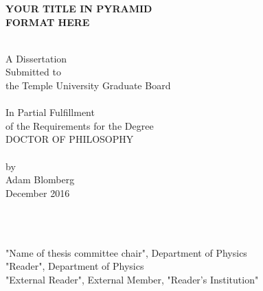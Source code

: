 \begin{titlepage}

\begin{centering} 
{\bf {\Large YOUR TITLE IN PYRAMID \\ FORMAT HERE}}

\vspace{1cm}
\noindent\makebox[\linewidth]{\rule{16cm}{0.4pt}} \\ 
\vspace{1cm}
A Dissertation                       \\
Submitted to                         \\
the Temple University Graduate Board \\
\vspace{1cm}
\noindent\makebox[\linewidth]{\rule{16cm}{0.4pt}} \\ 
\vspace{1cm} 
In Partial Fulfillment               \\
of the Requirements for the Degree   \\
DOCTOR OF PHILOSOPHY                 \\
\vspace{1cm} 
\noindent\makebox[\linewidth]{\rule{16cm}{0.4pt}} \\ 
\vspace{1cm} 
by                                   \\
Adam Blomberg                           \\
December 2016                          \\
\end{centering} 

\vspace{1cm}
\\
\vspace{0.20cm}

        \\
{"Name of thesis committee chair", Department of Physics}                                        \\
{"Reader", Department of Physics}                                       \\
{"External Reader", External Member, "Reader's Institution"}

\end{titlepage}
